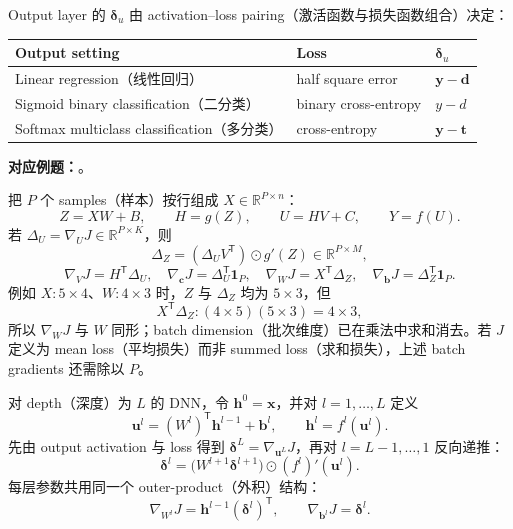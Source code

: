 Output layer 的 $\bm\delta_u$ 由 activation--loss pairing（激活函数与损失函数组合）决定：
\begin{center}
\small
\begin{tabularx}{0.92\textwidth}{@{}lXX@{}}
  \toprule
  Output setting & Loss & $\bm\delta_u$ \\
  \midrule
  Linear regression（线性回归） & half square error & $\bm y-\bm d$ \\
  Sigmoid binary classification（二分类） & binary cross-entropy & $y-d$ \\
  Softmax multiclass classification（多分类） & cross-entropy & $\bm y-\bm t$ \\
  \bottomrule
\end{tabularx}
\end{center}

\textbf{对应例题：}。


把 $P$ 个 samples（样本）按行组成 $X\in\mathbb R^{P\times n}$：
\[
  Z=XW+B,\qquad H=g(Z),\qquad U=HV+C,\qquad Y=f(U).
\]
若 $\Delta_U=\nabla_UJ\in\mathbb R^{P\times K}$，则
\[
  \boxed{\Delta_Z=(\Delta_UV^{\mathsf T})\odot g'(Z)}
  \in\mathbb R^{P\times M},
\]
\[
  \boxed{\nabla_VJ=H^{\mathsf T}\Delta_U},
  \quad
  \boxed{\nabla_{\bm c}J=\Delta_U^{\mathsf T}\bm1_P},
  \quad
  \boxed{\nabla_WJ=X^{\mathsf T}\Delta_Z},
  \quad
  \boxed{\nabla_{\bm b}J=\Delta_Z^{\mathsf T}\bm1_P}.
\]
例如 $X:5\times4$、$W:4\times3$ 时，$Z$ 与 $\Delta_Z$ 均为 $5\times3$，但
\[
  X^{\mathsf T}\Delta_Z:(4\times5)(5\times3)=4\times3,
\]
所以 $\nabla_WJ$ 与 $W$ 同形；batch dimension（批次维度）已在乘法中求和消去。若 $J$ 定义为 mean loss（平均损失）而非 summed loss（求和损失），上述 batch gradients 还需除以 $P$。


对 depth（深度）为 $L$ 的 DNN，令 $\bm h^0=\bm x$，并对 $l=1,\ldots,L$ 定义
\[
  \bm u^l=(W^l)^{\mathsf T}\bm h^{l-1}+\bm b^l,
  \qquad
  \bm h^l=f^l(\bm u^l).
\]
先由 output activation 与 loss 得到 $\bm\delta^L=\nabla_{\bm u^L}J$，再对 $l=L-1,\ldots,1$ 反向递推：
\[
  \boxed{\bm\delta^l
  =\bigl(W^{l+1}\bm\delta^{l+1}\bigr)
    \odot (f^l)'(\bm u^l)}.
\]
每层参数共用同一个 outer-product（外积）结构：
\[
  \boxed{\nabla_{W^l}J
  =\bm h^{l-1}(\bm\delta^l)^{\mathsf T}},
  \qquad
  \boxed{\nabla_{\bm b^l}J=\bm\delta^l}.
\]

